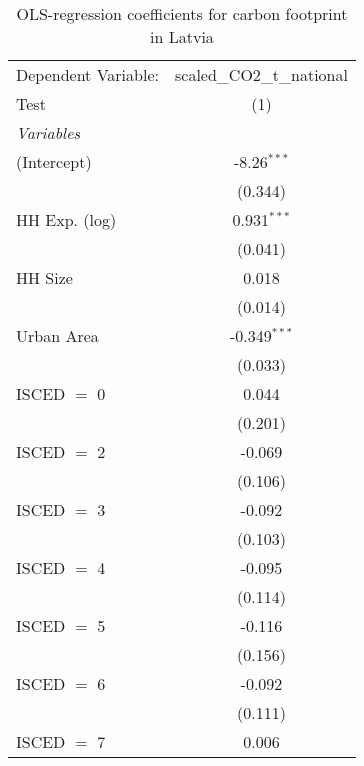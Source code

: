 
\begin{table}[htbp!]
   \centering
   \small
   \begin{adjustbox}{width = 1\textwidth, max height = 0.95\textheight, center}
      \begin{threeparttable}[b]
         \caption{\label{tab:OLS_2_LVA} OLS-regression coefficients for carbon footprint in Latvia}
         \begin{tabular}{lc}
            \tabularnewline \midrule \midrule
            Dependent Variable: & scaled\_CO2\_t\_national\\     
            Test                & (1)\\  
            \midrule
            \emph{Variables}\\
            (Intercept)         & -8.26$^{***}$\\   
                                & (0.344)\\   
            HH Exp. (log)       & 0.931$^{***}$\\   
                                & (0.041)\\   
            HH Size             & 0.018\\   
                                & (0.014)\\   
            Urban Area          & -0.349$^{***}$\\   
                                & (0.033)\\   
            ISCED $=$ 0         & 0.044\\   
                                & (0.201)\\   
            ISCED $=$ 2         & -0.069\\   
                                & (0.106)\\   
            ISCED $=$ 3         & -0.092\\   
                                & (0.103)\\   
            ISCED $=$ 4         & -0.095\\   
                                & (0.114)\\   
            ISCED $=$ 5         & -0.116\\   
                                & (0.156)\\   
            ISCED $=$ 6         & -0.092\\   
                                & (0.111)\\   
            ISCED $=$ 7         & 0.006\\   

\end{tabular}
\end{threeparttable}
\end{adjustbox}
\end{table}
